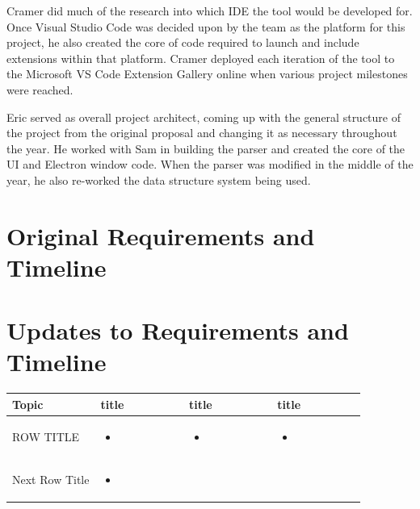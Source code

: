 \documentclass[letterpaper,10pt,titlepage,draftclsnofoot,onecolumn,onesided] {IEEEtran}
\begin{document}
Cramer did much of the research into which IDE the tool would be developed for. 
Once Visual Studio Code was decided upon by the team as the platform for this project, he also created the core of code required to launch and include extensions within that platform. 
Cramer deployed each iteration of the tool to the Microsoft VS Code Extension Gallery online when various project milestones were reached.

Eric served as overall project architect, coming up with the general structure of the project from the original proposal and changing it as necessary throughout the year. 
He worked with Sam in building the parser and created the core of the UI and Electron window code. 
When the parser was modified in the middle of the year, he also re-worked the data structure system being used.


\section{Original Requirements and Timeline}

\section{Updates to Requirements and Timeline}
\begin{center}
	\begin{singlespace}
		\begin{tabular}{ |  p{0.25\linewidth}  |  p{0.25\linewidth}  | p{0.25\linewidth} | p{0.25\linewidth} |}
		\hline
		Topic & title & title & title \\ \hline
		
			ROW TITLE
		& 
			\begin{itemize}
				\item 
			\end{itemize}
		& 
			\begin{itemize}
				\item 
			\end{itemize}
		&
			\begin{itemize}
				\item 
			\end{itemize} 
		\\ \hline
			Next Row Title
		& 
			\begin{itemize}
				\item 
			\end{itemize}
			
			\\ \hline
		\end{tabular}
	\end{singlespace}
\end{center}
\end{document}
